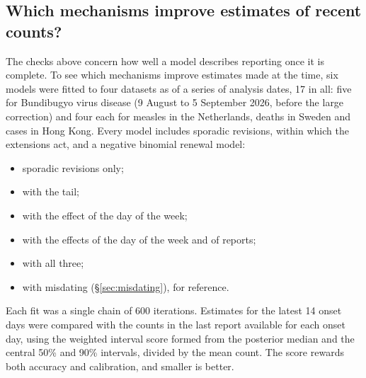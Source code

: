 \documentclass[11pt,a4paper]{article}
\begin{document}
\subsection{Which mechanisms improve estimates of recent counts?}\label{sec:comparison}

The checks above concern how well a model describes reporting once it is
complete. To see which mechanisms improve estimates made at the time, six
models were fitted to four datasets as of a series of analysis dates, 17 in
all: five for Bundibugyo virus disease (9 August to 5 September 2026, before
the large correction) and four each for measles in the Netherlands, deaths in
Sweden and cases in Hong Kong. Every model includes sporadic revisions, within
which the extensions act, and a negative binomial renewal model:
\begin{itemize}[itemsep=2pt]
\item sporadic revisions only;
\item with the tail;
\item with the effect of the day of the week;
\item with the effects of the day of the week and of reports;
\item with all three;
\item with misdating (\S\ref{sec:misdating}), for reference.
\end{itemize}
Each fit was a single chain of 600 iterations. Estimates for the latest 14
onset days were compared with the counts in the last report available for each
onset day, using the weighted interval score formed from the posterior median
and the central 50\% and 90\% intervals, divided by the mean count. The score
rewards both accuracy and calibration, and smaller is better.
\end{document}
